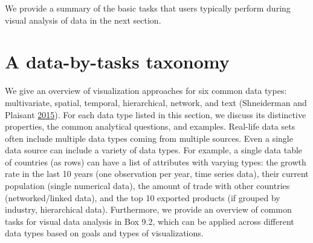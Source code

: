 \documentclass[]{krantz}
\begin{document}
We provide a summary of the basic tasks that users typically perform
during visual analysis of data in the next section.

\section{A data-by-tasks taxonomy}\label{sec:viz-3}

We give an overview of visualization approaches for six common data
types: multivariate, spatial, temporal, hierarchical, network, and text
(Shneiderman and Plaisant
\protect\hyperlink{ref-shneiderman2015sharpening}{2015}). For each data
type listed in this section, we discuss its distinctive properties, the
common analytical questions, and examples. Real-life data sets often
include multiple data types coming from multiple sources. Even a single
data source can include a variety of data types. For example, a single
data table of countries (as rows) can have a list of attributes with
varying types: the growth rate in the last 10 years (one observation per
year, time series data), their current population (single numerical
data), the amount of trade with other countries (networked/linked data),
and the top 10 exported products (if grouped by industry, hierarchical
data). Furthermore, we provide an overview of common tasks for visual
data analysis in Box 9.2, which can be applied across different data
types based on goals and types of visualizations.
\end{document}
